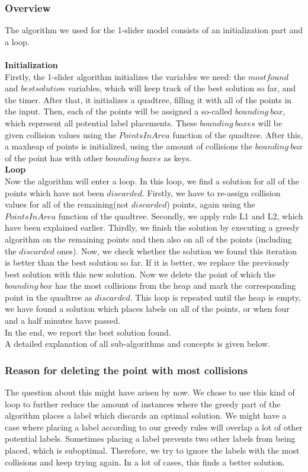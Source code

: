 \documentclass[crop=false,a4paper,oneside,11pt]{article}
\begin{document}
\subsubsection{Overview}
The algorithm we used for the 1-slider model consists of an initialization part and a loop. \\ \\
\textbf{Initialization}\\
Firstly, the 1-slider algorithm initializes the variables we need: the $mostfound$ and $bestsolution$ variables, which will keep track of the best solution so far, and the timer. After that, it initializes a quadtree, filling it with all of the points in the input. Then, each of the points will be assigned a so-called $bounding\ box$, which represent all potential label placements. These $bounding \ boxes$ will be given collision values using the $PointsInArea$ function of the quadtree. After this, a maxheap of points is initialized, using the amount of collisions the $bounding \ box$ of the point has with other $bounding \ boxes$ as keys. \\
\textbf{Loop} \\
Now the algorithm will enter a loop. In this loop, we find a solution for all of the points which have not been $discarded$. Firstly, we have to re-assign collision values for all of the remaining(not $discarded$) points, again using the $PointsInArea$ function of the quadtree. Secondly, we apply rule L1 and L2, which have been explained earlier. Thirdly, we finish the solution by executing a greedy algorithm on the remaining points and then also on all of the points (including the $discarded$ ones). Now, we check whether the solution we found this iteration is better than the best solution so far. If it is better, we replace the previously best solution with this new solution. Now we delete the point of which the $bounding \ box$ has the most collisions from the heap and mark the corresponding point in the quadtree as $discarded$. This loop is repeated until the heap is empty, we have found a solution which places labels on all of the points, or when four and a half minutes have passed. \\ 
In the end, we report the best solution found. \\ 

A detailed explanation of all sub-algorithms and concepts is given below. 

\subsubsection{Reason for deleting the point with most collisions}
The question about this might have arisen by now. We chose to use this kind of loop to further reduce the amount of instances where the greedy part of the algorithm places a label which discards an optimal solution. We might have a case where placing a label according to our greedy rules will overlap a lot of other potential labels. Sometimes placing a label prevents two other labels from being placed, which is suboptimal. Therefore, we try to ignore the labels with the most collisions and keep trying again. In a lot of cases, this finds a better solution.
\end{document}
